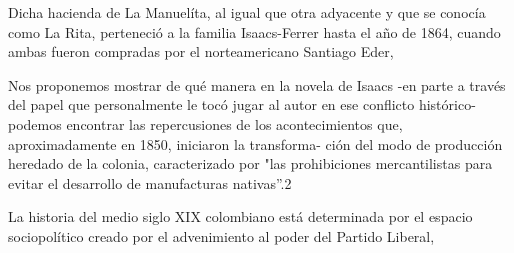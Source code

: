 \documentclass[12pt]{article}
\title{}
\makeatletter
\newcommand\iraggedright{%
	\let\\\@centercr\@rightskip\@flushglue \rightskip\@rightskip
	\leftskip\z@skip}
\makeatother
\begin{document}
	\makeheader
	\iraggedright
	
 Dicha hacienda de La Manuelíta, al igual que otra adyacente y
 que se conocía como La Rita, perteneció a la familia Isaacs-Ferrer hasta
 el año de 1864, cuando ambas fueron compradas por el norteamericano
 Santiago Eder,
 
 Nos proponemos mostrar de qué manera en la novela de Isaacs -en
 parte a través del papel que personalmente le tocó jugar al autor en
 ese conflicto histórico- podemos encontrar las repercusiones de los
 acontecimientos que, aproximadamente en 1850, iniciaron la transforma-
 ción del modo de producción heredado de la colonia, caracterizado por
 "las prohibiciones mercantilistas para evitar el desarrollo de manufacturas
 nativas”.2
 
 La historia del medio siglo XIX colombiano está determinada por el
 espacio sociopolítico creado por el advenimiento al poder del Partido Liberal,

\makeworkscited
\listoftodos
\end{document}
